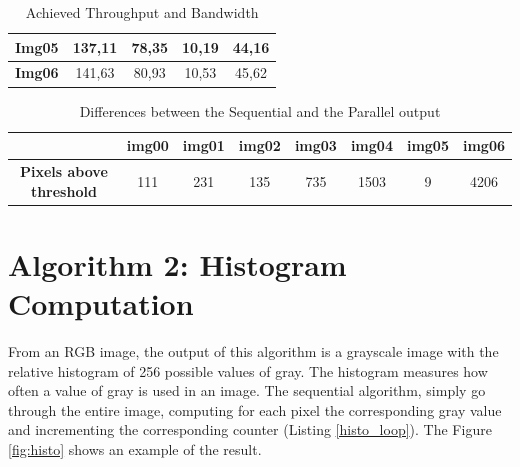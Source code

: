 \documentclass[a4paper]{article}
\begin{document}
\begin{table}[!ht]
\begin{tabular}{|c|c|c|c|c|}
\textbf{Img05} & 137,11                                                                            & 78,35                                                                         & 10,19                                                                        & 44,16                                                                          \\ \hline
\textbf{Img06} & 141,63                                                                            & 80,93                                                                         & 10,53                                                                        & 45,62                                                                          \\ \hline
\end{tabular}
\caption{Achieved Throughput and Bandwidth}
\label{tab:darker_t_b}
\end{table}
\FloatBarrier

\begin{table}[!ht]
\centering
\begin{tabular}{|c|l|c|c|l|l|l|l|}
\hline
\textbf{}                        & \textbf{img00}           & \textbf{img01} & \textbf{img02} & \textbf{img03}           & \textbf{img04}            & \textbf{img05}         & \textbf{img06}            \\ \hline
\textbf{Pixels above  threshold} & \multicolumn{1}{c|}{111} & 231            & 135            & \multicolumn{1}{c|}{735} & \multicolumn{1}{c|}{1503} & \multicolumn{1}{c|}{9} & \multicolumn{1}{c|}{4206} \\ \hline
\end{tabular}
\caption{Differences between the Sequential and the Parallel output}
\label{tab:pxabd}
\end{table}
\FloatBarrier

\newpage

\section{Algorithm 2: Histogram Computation}
\label{sec:hc}
From an RGB image, the output of this algorithm is a grayscale image with the relative histogram of 256 possible values of gray.
The histogram measures how often a value of gray is used in an image. The sequential algorithm, simply go through the entire image, computing for each pixel the corresponding gray value and incrementing the corresponding counter (Listing \ref{histo_loop}). The Figure \ref{fig:histo} shows an example of the result.
\end{document}
